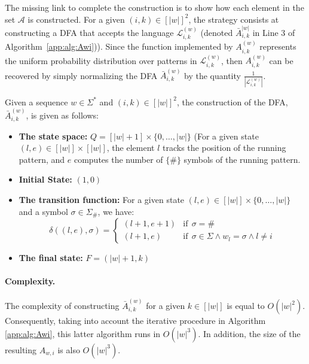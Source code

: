 The missing link to complete the construction is to show how each element in the set $\mathcal{A}$ is constructed. For a given $(i,k) \in [|w|]^{2}$, the strategy consists at constructing a DFA that accepts the language $\mathcal{L}_{i,k}^{(w)}$ (denoted $\bar{A}_{i,k}^{|w|}$ in Line 3 of Algorithm~\ref{app:alg:Awi})). Since the function implemented by $A_{i,k}^{(w)}$ represents the uniform probability distribution over patterns in $\mathcal{L}_{i,k}^{(w)}$, then $A_{i,k}^{(w)}$ can be recovered by simply normalizing the DFA $\bar{A}_{i,k}^{(w)}$ by the quantity $\frac{1}{|\mathcal{L}_{i,k}^{(w)}|}$.  

Given a sequence $w \in \Sigma^{*}$ and $(i,k) \in [|w|]^{2}$, the construction of the DFA, $\bar{A}_{i,k}^{(w)}$, is given as follows:
\begin{itemize}
    \item \textbf{The state space:} $Q = [|w|+1] \times \{0, \ldots, |w|\}$ (For a given state $(l,e) \in [|w|] \times [|w|]$, the element $l$ tracks the position of the running pattern, and $e$ computes the number of $\{\#\}$ symbols of the running pattern.
    \item \textbf{Initial State:} $(1,0)$
    \item \textbf{The transition function:} For a given state $(l,e) \in [|w|] \times \{0, \ldots, |w|\}$ and a symbol $\sigma \in \Sigma_{\#}$, we have:
    $$\delta((l,e),\sigma) = \begin{cases}
     (l+1, e+1) & \text{if} ~~\sigma = \# \\
     (l+1,e) & \text{if} ~~\sigma \in \Sigma \land w_{l} = \sigma \land l \neq i
    \end{cases}
    $$
    \item \textbf{The final state:} $F = (|w|+1 , k)$
\end{itemize}

\paragraph{Complexity.} The complexity of constructing $\bar{A}_{i,k}^{(w)}$ for a given $k \in [|w|]$ is equal to $O(|w|^{2})$. Consequently, taking into account the iterative procedure in Algorithm \ref{app:alg:Awi}, this latter algorithm runs in $O(|w|^{3})$. In addition, the size of the resulting $A_{w,i}$ is also $O(|w|^{3})$. 

